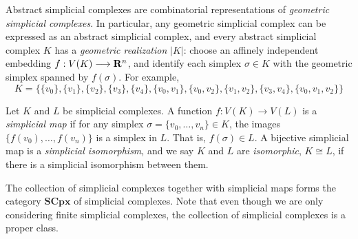 \begin{remark}
    Abstract simplicial complexes are combinatorial representations of \emph{geometric simplicial complexes}. In particular,
    any geometric simplicial complex can be expressed as an abstract simplicial complex, and every abstract simplicial complex
    $K$ has a \emph{geometric realization} $|K|$\autocite{wiki:asc}: choose an affinely independent embedding $f : V(K) \longrightarrow \mathbf{R}^n$,
    and identify each simplex $\sigma \in K$ with the geometric simplex spanned by $f(\sigma)$. For example,
    \[
        K = \{\{v_0\},\{v_1\},\{v_2\},\{v_3\},\{v_4\},\{v_0,v_1\},\{v_0,v_2\},\{v_1,v_2\},\{v_3,v_4\},\{v_0,v_1,v_2\}\}
    \]
    \begin{center}
    \end{center}
\end{remark}

\begin{definition}
    Let $K$ and $L$ be simplicial complexes. A function $f : V(K) \longrightarrow V(L)$ is a \emph{simplicial map}
    if for any simplex $\sigma = \{v_0, \dots, v_n\} \in K$, the images $\{f(v_0), \dots, f(v_n)\}$ is a simplex in $L$. That
    is, $f(\sigma) \in L$. A bijective simplicial map is a \emph{simplicial isomorphism}, and we say $K$ and $L$ are
    \emph{isomorphic}, $K \cong L$, if there is a simplicial isomorphism between them.
\end{definition}

\begin{remark}
    The collection of simplicial complexes together with simplicial maps forms the category $\mathbf{SCpx}$ of simplicial complexes.
    Note that even though we are only considering finite simplicial complexes, the collection of simplicial complexes is a proper
    class.
\end{remark}

